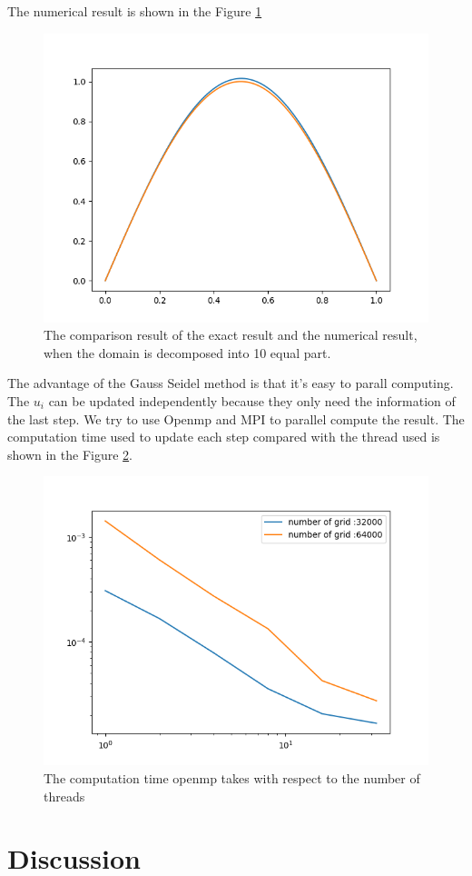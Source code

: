 \documentclass[11pt]{article}
\begin{document}
The numerical result is shown in the Figure \ref{fig:result comparison}
\begin{figure}
    \centering
    \includegraphics[width = 0.5\linewidth]{../CPP_code/1D_problem/openmp_version_gauss_seidel/result.png}
    \caption{The comparison result of the exact result and the numerical result, when the domain is decomposed into 10 equal part.}
    \label{fig:result comparison}
\end{figure}


The advantage of the Gauss Seidel method is that it's easy to parall computing. The $u_i$ can be updated independently because they only need the information of the last step. We try to use Openmp and MPI to parallel compute the result.  The computation time used to update each step compared with the thread used is shown in the Figure \ref{fig:openmp result}.
\begin{figure}
    \centering
    \includegraphics[width = 0.5\linewidth]{../CPP_code/1D_problem/openmp_version_gauss_seidel/open_mp_result.png}
    \caption{The computation time openmp takes with respect to the number of threads}
    \label{fig:openmp result}
\end{figure}


\section{Discussion}
\end{document}
